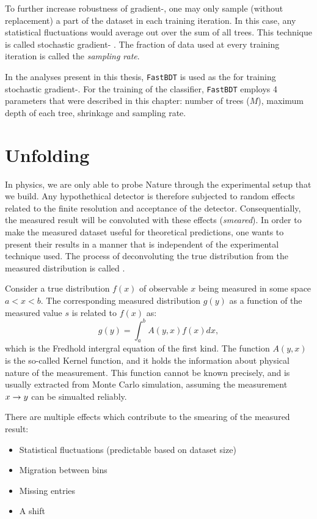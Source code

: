 To further increase robustness of gradient-, one may only sample (without replacement) a part of the dataset in each training iteration.
In this case, any statistical fluctuations would average out over the sum of all trees. 
This technique is called stochastic gradient- \cite{FRIEDMAN2002367}.
The fraction of data used at every training iteration is called the \textit{sampling rate}.

In the analyses present in this thesis, \texttt{FastBDT} \cite{Keck:2017gsv} is used as the \MVA for training stochastic gradient-.
For the training of the classifier, \texttt{FastBDT} employs 4 parameters that were described in this chapter: number of trees ($M$), maximum depth of each tree, shrinkage and sampling rate. 

\secti

\section{Unfolding}

In physics, we are only able to probe Nature through the experimental setup that we build.
Any hypothethical detector is therefore subjected to random effects related to the finite resolution and acceptance of the detector.
Consequentially, the measured result will be convoluted with these effects (\textit{smeared}).
In order to make the measured dataset useful for theoretical predictions, one wants to present their results in a manner that is independent of the experimental technique used.
The process of deconvoluting the true distribution from the measured distribution is called .

Consider a true distribution $f(x)$ of observable $x$ being measured in some space $a<x<b$.
The corresponding measured distribution $g(y)$ as a function of the measured value $s$ is related to $f(x)$ as:
\begin{equation}
    g(y) =  \int_a^b A(y,x) f(x) dx,
\end{equation}
which is the Fredhold intergral equation of the first kind. 
The function $A(y, x)$ is the so-called Kernel function, and it holds the information about physical nature of the measurement.
This function cannot be known precisely, and is usually extracted from Monte Carlo simulation, assuming the measurement $x\rightarrow y$ can be simualted reliably. 

There are multiple effects which contribute to the smearing of the measured result:
\begin{itemize}
    \item Statistical fluctuations (predictable based on dataset size)
    \item Migration between bins
    \item Missing entries
    \item A shift
\end{itemize}

